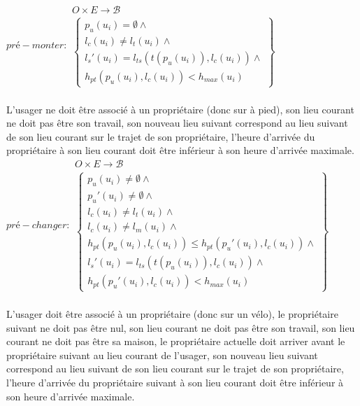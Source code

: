 \documentclass[french]{article}
\begin{document}
\\
$\displaystyle pré-monter:\begin{matrix}
O\times E\rightarrow \mathcal{B}\\
\begin{Bmatrix}
p_{u}( u_{i}) = \emptyset \land \\
l_{c}( u_{i}) \neq l_{t}( u_{i}) \land \\
l_{s} '( u_{i}) =l_{ts}( t( p_{u}( u_{i})) ,l_{c}( u_{i})) \land \\
h_{pt}( p_{u}( u_{i}) ,l_{c}( u_{i})) < h_{max}( u_{i})
\end{Bmatrix}
\end{matrix}$\\
\\
L'usager ne doit être associé à un propriétaire (donc sur à pied), son lieu courant ne doit pas être son travail, son nouveau lieu suivant correspond au lieu suivant de son lieu courant sur le trajet de son propriétaire, l'heure d'arrivée du propriétaire à son lieu courant doit être inférieur à son heure d'arrivée maximale.
\vspace*{0.5cm}
\\
$\displaystyle pré-changer:\begin{matrix}
O\times E\rightarrow \mathcal{B}\\
\begin{Bmatrix}
p_{u}( u_{i}) \neq \emptyset \land \\
p_{u} '( u_{i}) \neq \emptyset \land \\
l_{c}( u_{i}) \neq l_{t}( u_{i}) \land \\
l_{c}( u_{i}) \neq l_{m}( u_{i}) \land \\
h_{pt}( p_{u}( u_{i}) ,l_{c}( u_{i})) \leqslant h_{pt}( p_{u} '( u_{i}) ,l_{c}( u_{i})) \land \\
l_{s} '( u_{i}) =l_{ts}( t( p_{u}( u_{i})) ,l_{c}( u_{i})) \land \\
h_{pt}( p_{u} '( u_{i}) ,l_{c}( u_{i})) < h_{max}( u_{i})
\end{Bmatrix}
\end{matrix}$\\
\\
L'usager doit être associé à un propriétaire (donc sur un vélo), le propriétaire suivant ne doit pas être nul, son lieu courant ne doit pas être son travail, son lieu courant ne doit pas être sa maison, le propriétaire actuelle doit arriver avant le propriétaire suivant au lieu courant de l'usager, son nouveau lieu suivant correspond au lieu suivant de son lieu courant sur le trajet de son propriétaire, l'heure d'arrivée du propriétaire suivant à son lieu courant doit être inférieur à son heure d'arrivée maximale.
\end{document}
